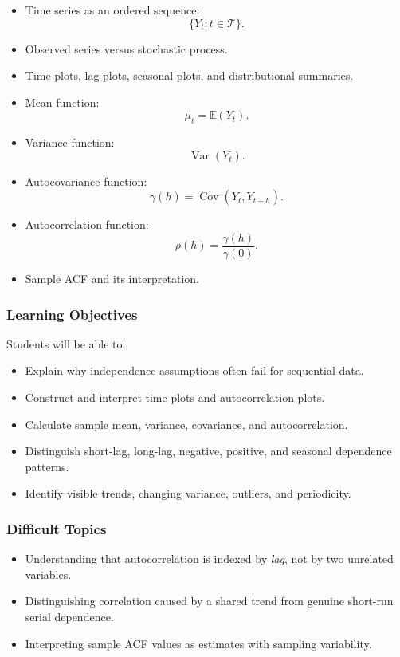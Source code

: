 \documentclass[11pt]{article}
\begin{document}
\begin{itemize}
    \item Time series as an ordered sequence:
    \[
    \{Y_t : t \in \mathcal{T}\}.
    \]
    \item Observed series versus stochastic process.
    \item Time plots, lag plots, seasonal plots, and distributional summaries.
    \item Mean function:
    \[
    \mu_t = \mathbb{E}(Y_t).
    \]
    \item Variance function:
    \[
    \operatorname{Var}(Y_t).
    \]
    \item Autocovariance function:
    \[
    \gamma(h) = \operatorname{Cov}(Y_t,Y_{t+h}).
    \]
    \item Autocorrelation function:
    \[
    \rho(h) = \frac{\gamma(h)}{\gamma(0)}.
    \]
    \item Sample ACF and its interpretation.
\end{itemize}

\subsubsection{Learning Objectives}

Students will be able to:

\begin{itemize}
    \item Explain why independence assumptions often fail for sequential data.
    \item Construct and interpret time plots and autocorrelation plots.
    \item Calculate sample mean, variance, covariance, and autocorrelation.
    \item Distinguish short-lag, long-lag, negative, positive, and seasonal
    dependence patterns.
    \item Identify visible trends, changing variance, outliers, and periodicity.
\end{itemize}

\subsubsection{Difficult Topics}

\begin{itemize}
    \item Understanding that autocorrelation is indexed by \emph{lag}, not by
    two unrelated variables.
    \item Distinguishing correlation caused by a shared trend from genuine
    short-run serial dependence.
    \item Interpreting sample ACF values as estimates with sampling variability.
\end{itemize}
\end{document}
